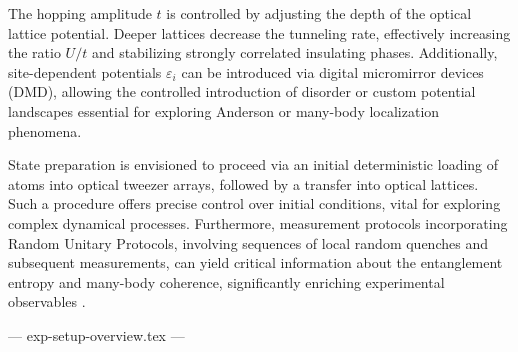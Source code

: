 The hopping amplitude $t$ is controlled by adjusting the depth of the optical lattice potential. Deeper lattices decrease the tunneling rate, effectively increasing the ratio $U/t$ and stabilizing strongly correlated insulating phases. Additionally, site-dependent potentials $\varepsilon_i$ can be introduced via digital micromirror devices (DMD), allowing the controlled introduction of disorder or custom potential landscapes essential for exploring Anderson or many-body localization phenomena.

State preparation is envisioned to proceed via an initial deterministic loading of atoms into optical tweezer arrays, followed by a transfer into optical lattices. Such a procedure offers precise control over initial conditions, vital for exploring complex dynamical processes. Furthermore, measurement protocols incorporating Random Unitary Protocols, involving sequences of local random quenches and subsequent measurements, can yield critical information about the entanglement entropy and many-body coherence, significantly enriching experimental observables \cite{culemann_construction_2024, huang_construction_2024}.



--- exp-setup-overview.tex ---

